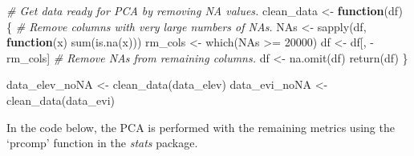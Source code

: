 \documentclass[
]{article}
\newenvironment{Shaded}{\begin{snugshade}}{\end{snugshade}}
\newcommand{\CommentTok}[1]{\textcolor[rgb]{0.56,0.35,0.01}{\textit{#1}}}
\newcommand{\ControlFlowTok}[1]{\textcolor[rgb]{0.13,0.29,0.53}{\textbf{#1}}}
\newcommand{\DecValTok}[1]{\textcolor[rgb]{0.00,0.00,0.81}{#1}}
\newcommand{\FunctionTok}[1]{\textcolor[rgb]{0.00,0.00,0.00}{#1}}
\newcommand{\NormalTok}[1]{#1}
\newcommand{\OtherTok}[1]{\textcolor[rgb]{0.56,0.35,0.01}{#1}}
\newcommand{\SpecialCharTok}[1]{\textcolor[rgb]{0.00,0.00,0.00}{#1}}
\begin{document}
\begin{Shaded}
\begin{Highlighting}[]
\CommentTok{\# Get data ready for PCA by removing NA values.}
\NormalTok{clean\_data }\OtherTok{\textless{}{-}} \ControlFlowTok{function}\NormalTok{(df) \{}
  \CommentTok{\# Remove columns with very large numbers of NAs.}
\NormalTok{  NAs }\OtherTok{\textless{}{-}} \FunctionTok{sapply}\NormalTok{(df, }\ControlFlowTok{function}\NormalTok{(x) }\FunctionTok{sum}\NormalTok{(}\FunctionTok{is.na}\NormalTok{(x)))}
\NormalTok{  rm\_cols }\OtherTok{\textless{}{-}} \FunctionTok{which}\NormalTok{(NAs }\SpecialCharTok{\textgreater{}=} \DecValTok{20000}\NormalTok{)}
\NormalTok{  df }\OtherTok{\textless{}{-}}\NormalTok{ df[, }\SpecialCharTok{{-}}\NormalTok{rm\_cols]}
  \CommentTok{\# Remove NAs from remaining columns.}
\NormalTok{  df }\OtherTok{\textless{}{-}} \FunctionTok{na.omit}\NormalTok{(df)}
  \FunctionTok{return}\NormalTok{(df)}
\NormalTok{\}}

\NormalTok{data\_elev\_noNA }\OtherTok{\textless{}{-}} \FunctionTok{clean\_data}\NormalTok{(data\_elev)}
\NormalTok{data\_evi\_noNA }\OtherTok{\textless{}{-}} \FunctionTok{clean\_data}\NormalTok{(data\_evi)}
\end{Highlighting}
\end{Shaded}

In the code below, the PCA is performed with the remaining metrics using
the `prcomp' function in the \emph{stats} package.
\end{document}
